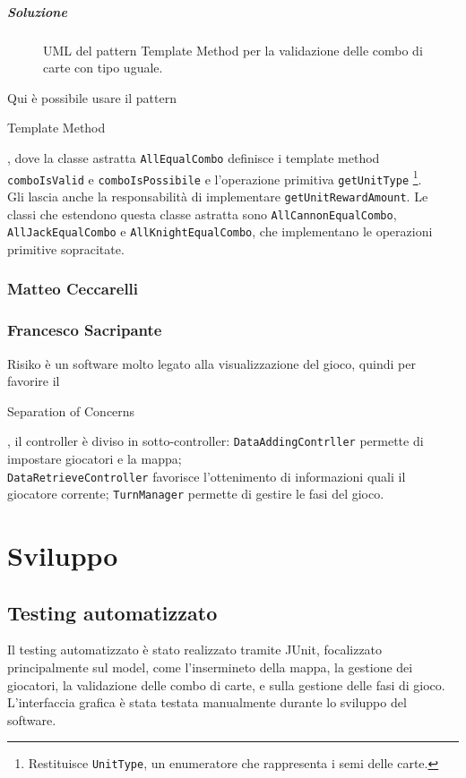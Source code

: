 \documentclass[a4paper,12pt]{report}
\begin{document}
\paragraph{Soluzione}
\begin{figure}[H]
	\centering
	
	\caption{UML del pattern Template Method per la validazione delle combo di carte con tipo uguale.}
\end{figure}
Qui è possibile usare il pattern \begin{itshape}Template Method\end{itshape}, dove la classe astratta \texttt{AllEqualCombo} definisce i template method \texttt{comboIsValid} e \texttt{comboIsPossibile} e l'operazione primitiva \texttt{getUnitType} \footnote{Restituisce \texttt{UnitType}, un enumeratore che rappresenta i semi delle carte.}.
\\
Gli lascia anche la responsabilità di implementare \texttt{getUnitRewardAmount}. Le classi che estendono questa classe astratta sono \texttt{AllCannonEqualCombo}, \texttt{AllJackEqualCombo} e \texttt{AllKnightEqualCombo}, che implementano le operazioni primitive sopracitate.

\subsection{Matteo Ceccarelli}
\subsection{Francesco Sacripante}
Risiko è un software molto legato alla visualizzazione del gioco, quindi per favorire il \begin{itshape}Separation of Concerns\end{itshape}, il controller è diviso in sotto-controller: \texttt{DataAddingContrller} permette di impostare giocatori e la mappa;
\\
\texttt{DataRetrieveController} favorisce l'ottenimento di informazioni quali il giocatore corrente; \texttt{TurnManager} permette di gestire le fasi del gioco.


\chapter{Sviluppo}

\section{Testing automatizzato}
Il testing automatizzato è stato realizzato tramite JUnit, focalizzato principalmente sul model, come l'insermineto della mappa, la gestione dei giocatori, la validazione delle combo di carte, e sulla gestione delle fasi di gioco.
L'interfaccia grafica è stata testata manualmente durante lo sviluppo del software.
\end{document}
